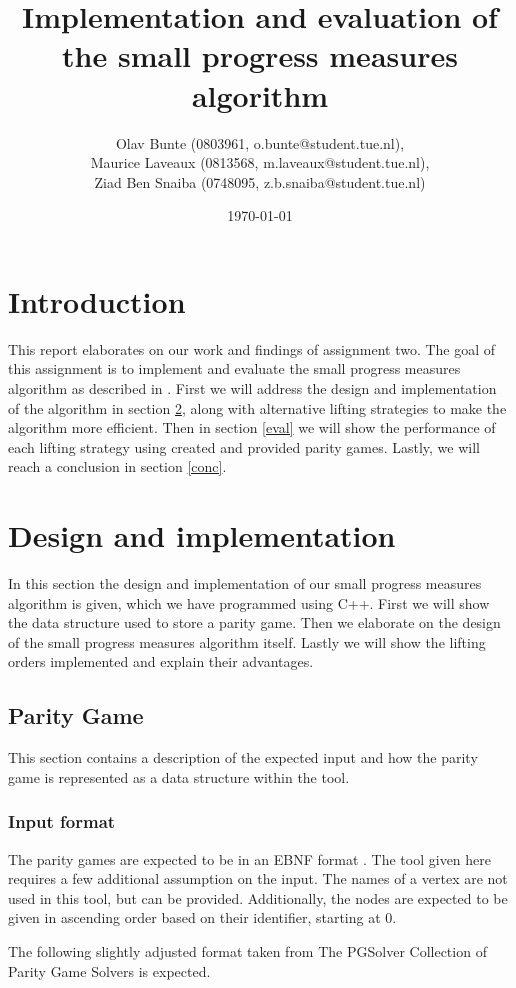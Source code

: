 \documentclass[10pt,a4paper]{article}
\title{Implementation and evaluation of the small progress measures algorithm}
\author{Olav Bunte (0803961, o.bunte@student.tue.nl),\\
Maurice Laveaux (0813568, m.laveaux@student.tue.nl),\\
Ziad Ben Snaiba (0748095, z.b.snaiba@student.tue.nl)}
\date{\today}
\begin{document}
\maketitle

\section{Introduction}
This report elaborates on our work and findings of assignment two. The goal of this assignment is to implement and evaluate the small progress measures algorithm as described in \cite{spmpaper}. First we will address the design and implementation of the algorithm in section \ref{design}, along with alternative lifting strategies to make the algorithm more efficient. Then in section \ref{eval} we will show the performance of each lifting strategy using created and provided parity games. Lastly, we will reach a conclusion in section \ref{conc}.

\section{Design and implementation}\label{design}
In this section the design and implementation of our small progress measures algorithm is given, which we have programmed using C++. First we will show the data structure
used to store a parity game. Then we elaborate on the design of the small progress measures algorithm itself. Lastly we will show the lifting orders implemented and explain their advantages.

\subsection{Parity Game}
This section contains a description of the expected input and how the parity game is represented as a data structure within the tool.

\subsubsection{Input format}
The parity games are expected to be in an EBNF format \cite{pgsreport}. The tool given here requires a few additional assumption on the input. The names of a vertex are not used in this tool, but can be provided. Additionally, the nodes are expected to be given in ascending order based on their identifier, starting at 0. 

The following slightly adjusted format taken from The PGSolver Collection of Parity Game Solvers \cite{pgsreport} is expected.
\end{document}
